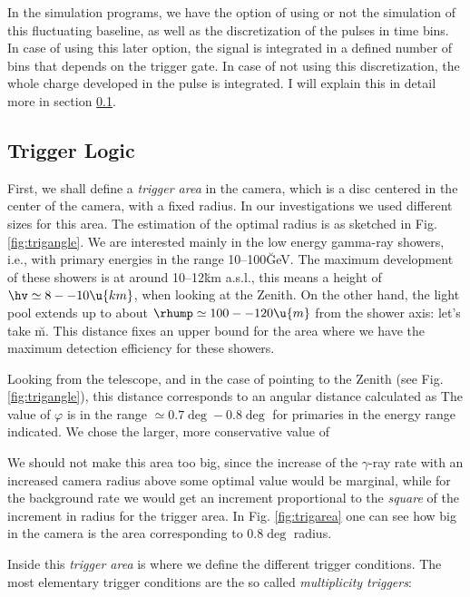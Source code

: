 \pulsefig

In the simulation programs, we have the option of using or not the
simulation of this fluctuating baseline, as well as the discretization
of the pulses in time bins. In case of using this later option, the
signal is integrated in a defined number of bins that depends on the
trigger gate. In case of not using this discretization, the whole
charge developed in the pulse is integrated. I will explain this in
detail more in section \ref{sec:triggerlogic}.

\subsection{Trigger Logic}
\label{sec:triggerlogic}
%
First, we shall define a \emph{trigger area} in the camera, which is a
disc centered in the center of the camera, with a fixed radius. In our
investigations we used different sizes for this area. The estimation
of the optimal radius is as sketched in Fig. \ref{fig:trigangle}. We
are interested mainly in the low energy gamma-ray showers, i.e., with
primary energies in the range 10--100\u{GeV}. The maximum development
of these showers is at around 10--12\u{km} a.s.l., this means a height
of $\hv \simeq 8--10\u{km}$, when looking at the Zenith. On the other
hand, the \Cherenkov light pool extends up to about
$\rhump \simeq 100--120\u{m}$ from the shower axis: let's take
\u{m}.  This distance fixes an upper bound for the area
where we have the maximum detection efficiency for these showers.

\triganglefig
%
Looking from the telescope, and in the case of pointing to the Zenith
(see Fig. \ref{fig:trigangle}), this distance corresponds to an
angular distance calculated as
%
\trigradeq
%
The value of $\varphi$ is in the range $\simeq 0.7\deg-0.8\deg$ for
primaries in the energy range indicated. We chose the larger, more
conservative value of
%
\phitriggereq

We should not make this area too big, since the increase of the
$\gamma$-ray rate with an increased camera radius above some optimal
value would be marginal, while for the background rate we would get an
increment proportional to the \emph{square} of the increment in radius
for the trigger area. In Fig. \ref{fig:trigarea} one can see how big
in the camera is the area corresponding to $0.8\deg$ radius.

Inside this \emph{trigger area} is where we define the different
trigger conditions. The most elementary trigger conditions are the so
called \emph{multiplicity triggers}:

